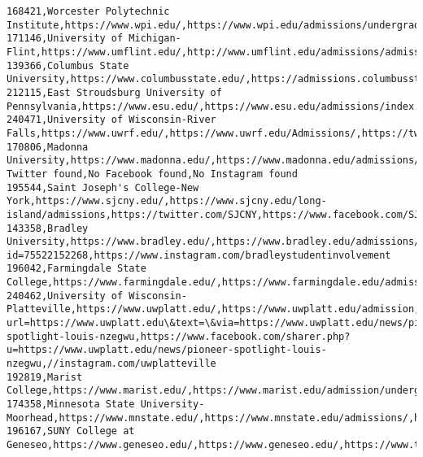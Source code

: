 \documentclass[11pt]{article}
\begin{document}
\begin{Verbatim}[commandchars=\\\{\}]
168421,Worcester Polytechnic Institute,https://www.wpi.edu/,https://www.wpi.edu/admissions/undergraduate,https://twitter.com/WPI,https://www.facebook.com/wpi.edu,https://www.instagram.com/wpi
171146,University of Michigan-Flint,https://www.umflint.edu/,http://www.umflint.edu/admissions/admissions,https://twitter.com/UMFlint,https://www.facebook.com/umflint,http://instagram.com/umflint/
139366,Columbus State University,https://www.columbusstate.edu/,https://admissions.columbusstate.edu/,https://twitter.com/ColumbusState,//www.facebook.com/ColumbusState,//instagram.com/ColumbusState
212115,East Stroudsburg University of Pennsylvania,https://www.esu.edu/,https://www.esu.edu/admissions/index.cfm,https://twitter.com/\#!/esuniversity,https://www.facebook.com/eaststroudsburguniversity,https://www.instagram.com/esuniversity/
240471,University of Wisconsin-River Falls,https://www.uwrf.edu/,https://www.uwrf.edu/Admissions/,https://twitter.com/UWRiverfalls,https://www.facebook.com/UWriverfalls,https://instagram.com/uwriverfalls
170806,Madonna University,https://www.madonna.edu/,https://www.madonna.edu/admissions/,No Twitter found,No Facebook found,No Instagram found
195544,Saint Joseph's College-New York,https://www.sjcny.edu/,https://www.sjcny.edu/long-island/admissions,https://twitter.com/SJCNY,https://www.facebook.com/SJCNY,https://instagram.com/sjcny/
143358,Bradley University,https://www.bradley.edu/,https://www.bradley.edu/admissions/,https://www.twitter.com/bradleyalumni,https://facebook.com/profile.php?id=75522152268,https://www.instagram.com/bradleystudentinvolvement
196042,Farmingdale State College,https://www.farmingdale.edu/,https://www.farmingdale.edu/admissions/,https://twitter.com/farmingdalesc,https://www.facebook.com/farmingdale,https://instagram.com/farmingdalesc/
240462,University of Wisconsin-Platteville,https://www.uwplatt.edu/,https://www.uwplatt.edu/admission,https://twitter.com/intent/tweet?url=https://www.uwplatt.edu\&text=\&via=https://www.uwplatt.edu/news/pioneer-spotlight-louis-nzegwu,https://www.facebook.com/sharer.php?u=https://www.uwplatt.edu/news/pioneer-spotlight-louis-nzegwu,//instagram.com/uwplatteville
192819,Marist College,https://www.marist.edu/,https://www.marist.edu/admission/undergraduate,https://twitter.com/Marist,https://www.facebook.com/marist/,https://www.instagram.com/marist/
174358,Minnesota State University-Moorhead,https://www.mnstate.edu/,https://www.mnstate.edu/admissions/,https://www.twitter.com/MSUMoorhead,https://www.facebook.com/msumoorhead,https://www.instagram.com/msumoorhead
196167,SUNY College at Geneseo,https://www.geneseo.edu/,https://www.geneseo.edu/,https://www.twitter.com/SUNYGeneseo,https://www.facebook.com/events/772673766410821/,https://www.instagram.com/sunygeneseo

\end{Verbatim}
\end{document}
